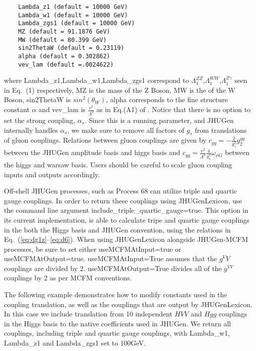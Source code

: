 \documentclass[aps,superscriptaddress,nofootinbib]{revtex4}
\begin{document}
\begin{verbatim}
    Lambda_z1 (default = 10000 GeV)
    Lambda_w1 (default = 10000 GeV)
    Lambda_zgs1 (default = 10000 GeV)
    MZ (default = 91.1876 GeV)
    MW (default = 80.399 GeV)
    sin2ThetaW (default = 0.23119)
    alpha (default = 0.302862)
    vev_lam (default =.0024622)
\end{verbatim}
where Lambda\_z1,Lambda\_w1,Lambda\_zgs1 correspond to $\Lambda_1^{ZZ}$,$\Lambda_1^{WW}$,$\Lambda_1^{Z\gamma}$ 
seen in Eq.~(1) respectively, MZ is the mass of the Z Boson, MW is the of the W Boson, sin2ThetaW is $sin^2(\theta_W)$, alpha corresponds to the fine structure constant $\alpha$ and vev\_lam is $\frac{v^2}{\Lambda^2}$ as in Eq.(A1) of \cite{Gritsan:2020pib}. Notice that there is no option to set the strong coupling, $\alpha_s$. Since this is a running parameter, and JHUGen internally handles $\alpha_s$, we make sure to remove all factors of $g_s$ from translations of gluon couplings. Relations between gluon couplings are given by $c_{gg}=-\frac{2}{g_s^2}g_2^{gg}$ between the JHUGen amplitude basis and higgs basis and $c_{gg}=\frac{v^2}{\Lambda^2}\frac{4}{g_s^2} \omega_{\phi G}$ between the higgs and warsaw basis. Users should be careful to scale gluon coupling inputs and outputs accordingly. 


Off-shell JHUGen processes, such as Process 68 can utilize triple and quartic gauge couplings. In order to return these couplings 
using JHUGenLexicon, use the command line argument include\_triple\_quartic\_gauge=true. This option in its current implementation, 
is able to calculate tripe and quartic gauge couplings in the both the Higgs basis and JHUGen convention, using the relations in 
Eq.~(\ref{eq:dg1z}--\ref{eq:d6}). When using JHUGenLexicon alongside JHUGen-MCFM processes, be sure to set either 
useMCFMAtInput=true or useMCFMAtOutput=true. useMCFMAtInput=True assumes that the $g^VV$ couplings are divided by 2. 
useMCFMAtOutput=True divides all of the $g^{VV}$ couplings by 2 as per MCFM conventions.

The following example demonstrates how to modify constants used in the coupling translation, as well as the couplings that are 
output by JHUGenLexicon. In this case we include translation from 10 independent $HVV$ and $Hgg$ couplings in the Higgs basis 
to the native coefficients used in JHUGen. We return all couplings, including triple and quartic gauge couplings, 
with Lambda\_w1, Lambda\_z1 and Lambda\_zgs1 set to 100GeV.
\end{document}
